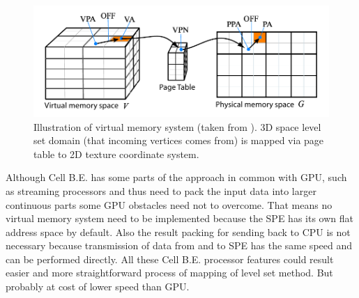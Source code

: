 \begin{figure}
    \centering
    \includegraphics[width=\textwidth]{data/png/gpuVirtMemory}
    \caption[GPU virtual memory]{Illustration of virtual memory system (taken from \cite{lefonhGPUSolver}). 3D space level set domain (that incoming vertices comes from) is mapped via page table to 2D texture coordinate system.}
    \label{fg:virtual memory on GPU}
\end{figure}

\par
Although Cell B.E. has some parts of the approach in common with GPU, such as streaming processors and thus need to pack the input data into larger continuous parts some GPU obstacles need not to overcome.
That means no virtual memory system need to be implemented because the SPE has its own flat address space by default.
Also the result packing for sending back to CPU is not necessary because transmission of data from and to SPE has the same speed and can be performed directly.
All these Cell B.E. processor features could result easier and more straightforward process of mapping of level set method.
But probably at cost of lower speed than GPU.